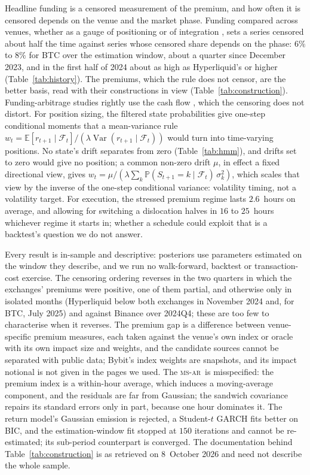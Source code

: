 \documentclass[10pt,a4paper]{article}
\newcommand{\E}{\mathbb{E}}
\newcommand{\Prob}{\mathbb{P}}
\newcommand{\Var}{\operatorname{Var}}
\newcommand{\MSAR}{\textsc{ms-ar}}
\newcommand{\given}{\mid}
\newcommand{\Filt}{\mathcal{F}}
\begin{document}
Headline funding is a censored measurement of the premium, and how often it is censored depends on the venue and the market phase. Funding compared across venues, whether as a gauge of positioning or of integration \citep{zhivkov2026funding,zhivkov2026temporal}, sets a series censored about half the time against series whose censored share depends on the phase: $6\%$ to $8\%$ for BTC over the estimation window, about a quarter since December 2023, and in the first half of 2024 about as high as Hyperliquid's or higher (Table~\ref{tab:history}). The premiums, which the rule does not censor, are the better basis, read with their constructions in view (Table~\ref{tab:construction}). Funding-arbitrage studies rightly use the cash flow \citep{werapun2026funding,lau2026carry}, which the censoring does not distort. For position sizing, the filtered state probabilities give one-step conditional moments that a mean-variance rule $w_t = \E[r_{t+1}\given\Filt_t]/(\lambda \Var(r_{t+1}\given\Filt_t))$ would turn into time-varying positions. No state's drift separates from zero (Table~\ref{tab:hmm}), and drifts set to zero would give no position; a common non-zero drift $\mu$, in effect a fixed directional view, gives $w_t = \mu/(\lambda \sum_k \Prob(S_{t+1}{=}k\given\Filt_t)\,\sigma_k^2)$, which scales that view by the inverse of the one-step conditional variance: volatility timing, not a volatility target. For execution, the stressed premium regime lasts $2.6$~hours on average, and allowing for switching a dislocation halves in $16$ to $25$~hours whichever regime it starts in; whether a schedule could exploit that is a backtest's question we do not answer.

Every result is in-sample and descriptive: posteriors use parameters estimated on the window they describe, and we run no walk-forward, backtest or transaction-cost exercise. The censoring ordering reverses in the two quarters in which the exchanges' premiums were positive, one of them partial, and otherwise only in isolated months (Hyperliquid below both exchanges in November 2024 and, for BTC, July 2025) and against Binance over 2024Q4; these are too few to characterise when it reverses. The premium gap is a difference between venue-specific premium measures, each taken against the venue's own index or oracle with its own impact size and weights, and the candidate sources cannot be separated with public data; Bybit's index weights are snapshots, and its impact notional is not given in the pages we used. The \MSAR\ is misspecified: the premium index is a within-hour average, which induces a moving-average component, and the residuals are far from Gaussian; the sandwich covariance repairs its standard errors only in part, because one hour dominates it. The return model's Gaussian emission is rejected, a Student-$t$ GARCH fits better on BIC, and the estimation-window fit stopped at $150$ iterations and cannot be re-estimated; its sub-period counterpart is converged. The documentation behind Table~\ref{tab:construction} is as retrieved on 8~October 2026 and need not describe the whole sample.
\end{document}
